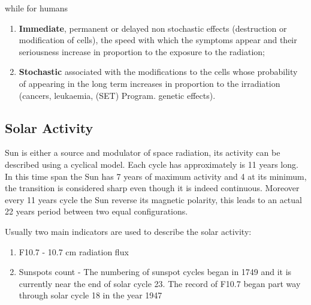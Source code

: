 \documentclass[./dissertation.tex]{subfiles}
\begin{document}
while for humans

\begin{enumerate}
    \item \textbf{Immediate}, permanent or delayed  non  stochastic  effects (destruction or modification of cells), the speed with which the symptoms appear  and  their  seriousness  increase in proportion to the exposure to the radiation;
    \item \textbf {Stochastic}   associated  with the modifications to the cells whose probability of appearing in the long term  increases in proportion to  the irradiation  (cancers,  leukaemia, (SET) Program. genetic effects).
\end{enumerate}

\subsection{Solar Activity}
Sun is either a source and modulator of space radiation, its activity can be described using a cyclical model. Each cycle has approximately is 11 years long. In this time span the Sun has 7 years of maximum activity and 4 at its minimum, the transition is considered sharp even though it is indeed continuous. Moreover every 11 years cycle the Sun reverse its magnetic polarity, this leads to an actual 22 years period between two equal configurations.

Usually two main indicators are used to describe the solar activity:
\begin{enumerate}
    \item F10.7 - 10.7 cm radiation flux
    \item Sunspots count - The numbering of sunspot
cycles began in 1749 and it is currently near the end of solar
cycle 23. The record of F10.7 began part way through solar
cycle 18 in the year 1947
\end{enumerate}
\end{document}
